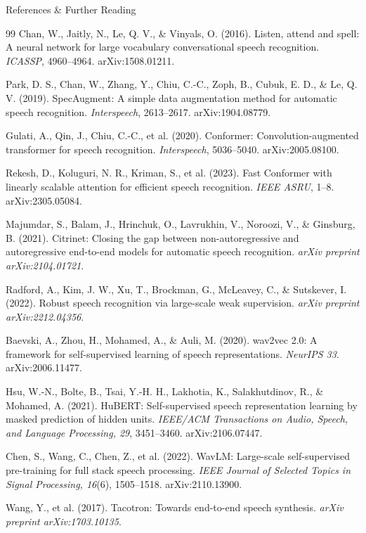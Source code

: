 \begin{frame}[allowframebreaks]{References \& Further Reading}
\begin{thebibliography}{99}
Chan, W., Jaitly, N., Le, Q. V., \& Vinyals, O. (2016). Listen, attend and spell: A neural network for large vocabulary conversational speech recognition. \textit{ICASSP}, 4960--4964. arXiv:1508.01211.

Park, D. S., Chan, W., Zhang, Y., Chiu, C.-C., Zoph, B., Cubuk, E. D., \& Le, Q. V. (2019). SpecAugment: A simple data augmentation method for automatic speech recognition. \textit{Interspeech}, 2613--2617. arXiv:1904.08779.

Gulati, A., Qin, J., Chiu, C.-C., et al. (2020). Conformer: Convolution-augmented transformer for speech recognition. \textit{Interspeech}, 5036--5040. arXiv:2005.08100.

Rekesh, D., Koluguri, N. R., Kriman, S., et al. (2023). Fast Conformer with linearly scalable attention for efficient speech recognition. \textit{IEEE ASRU}, 1--8. arXiv:2305.05084.

Majumdar, S., Balam, J., Hrinchuk, O., Lavrukhin, V., Noroozi, V., \& Ginsburg, B. (2021). Citrinet: Closing the gap between non-autoregressive and autoregressive end-to-end models for automatic speech recognition. \textit{arXiv preprint arXiv:2104.01721}.

Radford, A., Kim, J. W., Xu, T., Brockman, G., McLeavey, C., \& Sutskever, I. (2022). Robust speech recognition via large-scale weak supervision. \textit{arXiv preprint arXiv:2212.04356}.

Baevski, A., Zhou, H., Mohamed, A., \& Auli, M. (2020). wav2vec 2.0: A framework for self-supervised learning of speech representations. \textit{NeurIPS 33}. arXiv:2006.11477.

Hsu, W.-N., Bolte, B., Tsai, Y.-H. H., Lakhotia, K., Salakhutdinov, R., \& Mohamed, A. (2021). HuBERT: Self-supervised speech representation learning by masked prediction of hidden units. \textit{IEEE/ACM Transactions on Audio, Speech, and Language Processing, 29}, 3451--3460. arXiv:2106.07447.

Chen, S., Wang, C., Chen, Z., et al. (2022). WavLM: Large-scale self-supervised pre-training for full stack speech processing. \textit{IEEE Journal of Selected Topics in Signal Processing, 16}(6), 1505--1518. arXiv:2110.13900.

Wang, Y., et al. (2017). Tacotron: Towards end-to-end speech synthesis. \textit{arXiv preprint arXiv:1703.10135}.


\end{thebibliography}
\end{frame}
